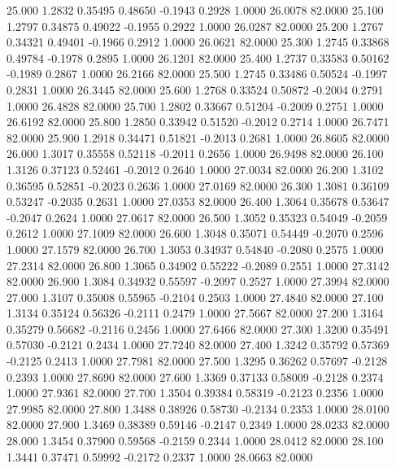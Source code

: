   25.000   1.2832   0.35495   0.48650  -0.1943   0.2928   1.0000  26.0078  82.0000
  25.100   1.2797   0.34875   0.49022  -0.1955   0.2922   1.0000  26.0287  82.0000
  25.200   1.2767   0.34321   0.49401  -0.1966   0.2912   1.0000  26.0621  82.0000
  25.300   1.2745   0.33868   0.49784  -0.1978   0.2895   1.0000  26.1201  82.0000
  25.400   1.2737   0.33583   0.50162  -0.1989   0.2867   1.0000  26.2166  82.0000
  25.500   1.2745   0.33486   0.50524  -0.1997   0.2831   1.0000  26.3445  82.0000
  25.600   1.2768   0.33524   0.50872  -0.2004   0.2791   1.0000  26.4828  82.0000
  25.700   1.2802   0.33667   0.51204  -0.2009   0.2751   1.0000  26.6192  82.0000
  25.800   1.2850   0.33942   0.51520  -0.2012   0.2714   1.0000  26.7471  82.0000
  25.900   1.2918   0.34471   0.51821  -0.2013   0.2681   1.0000  26.8605  82.0000
  26.000   1.3017   0.35558   0.52118  -0.2011   0.2656   1.0000  26.9498  82.0000
  26.100   1.3126   0.37123   0.52461  -0.2012   0.2640   1.0000  27.0034  82.0000
  26.200   1.3102   0.36595   0.52851  -0.2023   0.2636   1.0000  27.0169  82.0000
  26.300   1.3081   0.36109   0.53247  -0.2035   0.2631   1.0000  27.0353  82.0000
  26.400   1.3064   0.35678   0.53647  -0.2047   0.2624   1.0000  27.0617  82.0000
  26.500   1.3052   0.35323   0.54049  -0.2059   0.2612   1.0000  27.1009  82.0000
  26.600   1.3048   0.35071   0.54449  -0.2070   0.2596   1.0000  27.1579  82.0000
  26.700   1.3053   0.34937   0.54840  -0.2080   0.2575   1.0000  27.2314  82.0000
  26.800   1.3065   0.34902   0.55222  -0.2089   0.2551   1.0000  27.3142  82.0000
  26.900   1.3084   0.34932   0.55597  -0.2097   0.2527   1.0000  27.3994  82.0000
  27.000   1.3107   0.35008   0.55965  -0.2104   0.2503   1.0000  27.4840  82.0000
  27.100   1.3134   0.35124   0.56326  -0.2111   0.2479   1.0000  27.5667  82.0000
  27.200   1.3164   0.35279   0.56682  -0.2116   0.2456   1.0000  27.6466  82.0000
  27.300   1.3200   0.35491   0.57030  -0.2121   0.2434   1.0000  27.7240  82.0000
  27.400   1.3242   0.35792   0.57369  -0.2125   0.2413   1.0000  27.7981  82.0000
  27.500   1.3295   0.36262   0.57697  -0.2128   0.2393   1.0000  27.8690  82.0000
  27.600   1.3369   0.37133   0.58009  -0.2128   0.2374   1.0000  27.9361  82.0000
  27.700   1.3504   0.39384   0.58319  -0.2123   0.2356   1.0000  27.9985  82.0000
  27.800   1.3488   0.38926   0.58730  -0.2134   0.2353   1.0000  28.0100  82.0000
  27.900   1.3469   0.38389   0.59146  -0.2147   0.2349   1.0000  28.0233  82.0000
  28.000   1.3454   0.37900   0.59568  -0.2159   0.2344   1.0000  28.0412  82.0000
  28.100   1.3441   0.37471   0.59992  -0.2172   0.2337   1.0000  28.0663  82.0000
